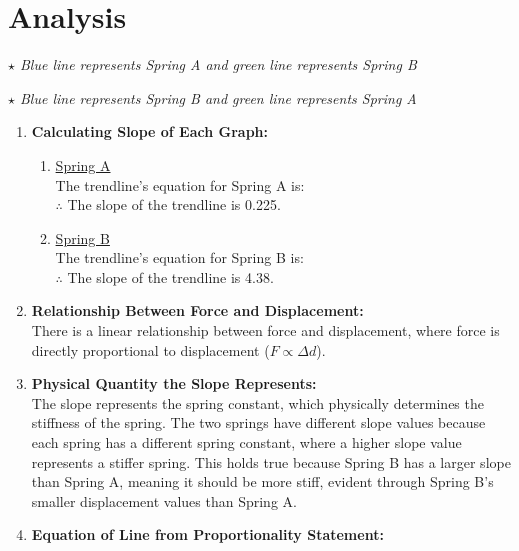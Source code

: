 \documentclass[12pt,letterpaper]{article}
\begin{document}
\section{Analysis}
\vspace{-4mm}

\vspace{-8mm}
\hspace{8mm}
\textit{$\star$ Blue line represents Spring A and green line represents Spring B}

\vspace{-8mm}
\hspace{1mm}
\textit{$\star$ Blue line represents Spring B and green line represents Spring A}
\begin{enumerate}[font=\bfseries]
	\item \textbf{Calculating Slope of Each Graph:}
	      \vspace{-4mm}
	      \begin{enumerate}
		      \item \underline{Spring A}\\
		            The trendline's equation for Spring A is:~\\
		            $\therefore$ The slope of the trendline is 0.225.
		      \item \underline{Spring B}\\
		            The trendline's equation for Spring B is:~\\
		            $\therefore$ The slope of the trendline is 4.38.
	      \end{enumerate}
	      \newpage
	\item \textbf{Relationship Between Force and Displacement:}\\
	      There is a linear relationship between force and displacement, where force is directly proportional to displacement ($F \propto \Delta d$).
	\item \textbf{Physical Quantity the Slope Represents:}\\
	      The slope represents the spring constant, which physically determines the stiffness of the spring.
	      The two springs have different slope values because each spring has a different spring constant, where a higher slope value represents a stiffer spring.
	      This holds true because Spring B has a larger slope than Spring A, meaning it should be more stiff, evident through Spring B's smaller displacement values than Spring A.
	\item \textbf{Equation of Line from Proportionality Statement:}\\

\end{enumerate}
\end{document}
